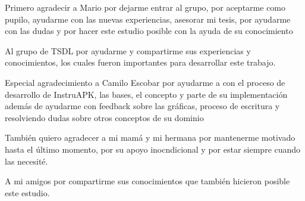 \documentclass[
12pt, %
english, %
onehalfspacing, %
nolistspacing, %
liststotoc, %
parskip, %
headsepline, %
consistentlayout, %
]{MastersDoctoralThesis} %
\begin{document}
\begin{acknowledgements}
\addchaptertocentry{\acknowledgementname} %

Primero agradecir a Mario por dejarme entrar al grupo, por aceptarme como pupilo, ayudarme con las nuevas experiencias, asesorar mi tesis, por ayudarme con las dudas y por hacer este estudio posible con la ayuda de su conocimiento

Al grupo de TSDL por ayudarme y compartirme sus experiencias y conocimientos, los cuales fueron importantes para desarrollar este trabajo. 

Especial agradecimiento a Camilo Escobar por ayudarme a con el proceso de desarrollo de InstruAPK, las bases, el concepto y parte de su implementación además de ayudarme con feedback sobre las gráficas, proceso de escritura y resolviendo dudas sobre otros conceptos de su dominio

También quiero agradecer a mi mamá y mi hermana por mantenerme motivado hasta el último momento, por su apoyo inocndicional y por estar siempre cuando las necesité.

A mi amigos por compartirme sus conocimientos que también hicieron posible este estudio.
\end{acknowledgements}


\tableofcontents %

\listoffigures %

\listoftables %





\end{document}
